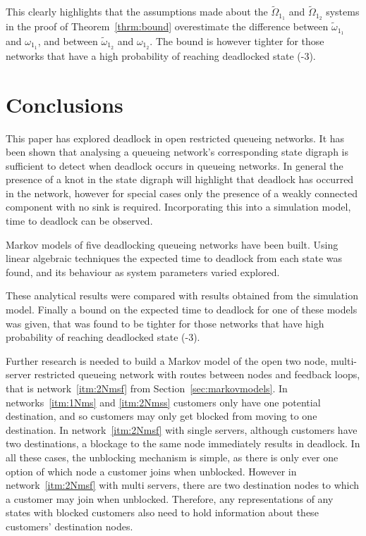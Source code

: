 \documentclass{article}
\numberwithin{equation}{section}
\begin{document}
This clearly highlights that the assumptions made about the
$\widetilde{\Omega}_{1_1}$ and $\widetilde{\Omega}_{1_2}$ systems in the proof
of Theorem~\ref{thrm:bound} overestimate the difference between
$\widetilde{\omega}_{1_1}$ and $\omega_{1_1}$, and between
$\widetilde{\omega}_{1_2}$ and $\omega_{1_2}$.
The bound is however tighter for those networks that have a high probability
of reaching deadlocked state (-3).


\section{Conclusions}\label{sec:conclusions}

This paper has explored deadlock in open restricted queueing networks.
It has been shown that analysing a queueing network's corresponding state
digraph is sufficient to detect when deadlock occurs in queueing networks.
In general the presence of a knot in the state digraph will highlight that
deadlock has occurred in the network, however for special cases only the
presence of a weakly connected component with no sink is required.
Incorporating this into a simulation model, time to deadlock can be observed.

Markov models of five deadlocking queueing networks have been built.
Using linear algebraic techniques the expected time to deadlock from each
state was found, and its behaviour as system parameters varied explored.

These analytical results were compared with results obtained from the
simulation model.
Finally a bound on the expected time to deadlock for one of these models was
given, that was found to be tighter for those networks that have high
probability of reaching deadlocked state (-3).

Further research is needed to build a Markov model of the open two node,
multi-server restricted queueing network with routes between nodes and
feedback loops, that is network~\ref{itm:2Nmsf} from Section~\ref{sec:markovmodels}.
In networks~\ref{itm:1Nms} and \ref{itm:2Nmss} customers only have one
potential destination, and so customers may only get blocked from moving to
one destination.
In network~\ref{itm:2Nmsf} with single servers, although customers have two
destinations, a blockage to the same node immediately results in deadlock.
In all these cases, the unblocking mechanism is simple, as there is only ever
one option of which node a customer joins when unblocked.
However in network~\ref{itm:2Nmsf} with multi servers, there are two
destination nodes to which a customer may join when unblocked.
Therefore, any representations of any states with blocked customers also need
to hold information about these customers' destination nodes.
\end{document}
